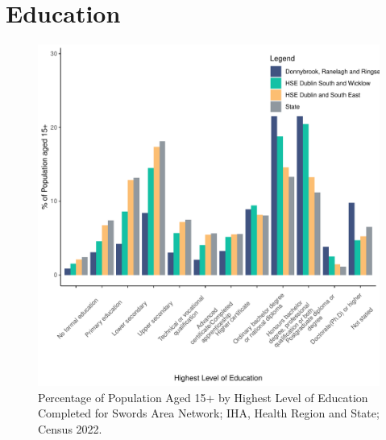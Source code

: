 \documentclass{article}
\begin{document}
\section{Education}\label{sect:Edu}
\begin{figure}[H]
	\centering
	\includegraphics[width = 120mm]{../figures/EduED.pdf}
	\caption{Percentage of Population Aged 15+ by Highest Level of Education Completed for Swords Area Network; IHA, Health Region and State; Census 2022.}
	\label{fig:vbnv}
	\end{figure}
\end{document}
